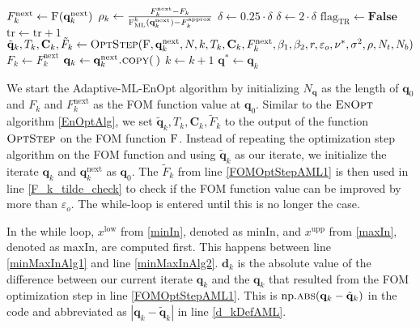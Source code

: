 \begin{algorithm}[H]
\begin{algorithmic}[1]
\State $F^\mathrm{next}_k\gets \Call{F}{\mathbf{q}^\mathrm{next}_k}$
\State\label{rhoKDef} $\rho_k\gets \frac{F^\mathrm{next}_k-F_k}{\Call{F$_\mathrm{ML}^k$}{\mathbf{q}^\mathrm{next}_k}-F^\mathrm{approx}_k}$
\State $\delta\gets0.25\cdot\delta$
\Else
{}
\State $\delta\gets2\cdot\delta$
\EndIf
\EndIf
{}
\State $\mathrm{flag}_\mathrm{TR}\gets\mathbf{False}$
\EndIf
\EndWhile
\State $\mathrm{tr}\gets\mathrm{tr}+1$
\EndWhile
\State\label{FOMOptStepAML2} $\tilde{\mathbf{q}}_k,T_k,\mathbf{C}_k,\tilde{F}_k\gets\Call{OptStep}{\textproc{F},\mathbf{q}^\mathrm{next}_k,N,k,T_k,\mathbf{C}_k, F^\mathrm{next}_k, \beta_1, \beta_2, r, \varepsilon_o ,\nu^*, \sigma^2, \rho, N_t, N_b}$
\State $F_k \gets F^\mathrm{next}_k$
\State\label{AMLSetqk} $\mathbf{q}_k \gets \mathbf{q}^\mathrm{next}_k\Call{.copy}{\:}$
\State $k\gets k+1$
\EndWhile
\State \Return $\mathbf{q}^*\gets\mathbf{q}_k$
\EndFunction
\end{algorithmic}
\end{algorithm}

We start the Adaptive-ML-EnOpt algorithm by initializing $N_\mathbf{q}$ as the length of ${\mathbf{q}_0}$ and $F_k$ and $F^\mathrm{next}_k$ as the FOM function value at $\mathbf{q}_0$. Similar to the $\textproc{EnOpt}$ algorithm \ref{EnOptAlg}, we set $\tilde{\mathbf{q}}_k,T_k,\mathbf{C}_k,\tilde{F}_k$ to the output of the function $\textproc{OptStep}$ on the FOM function $\textproc{F}$. Instead of repeating the optimization step algorithm on the FOM function and using $\tilde{\mathbf{q}}_k$ as our iterate, we initialize the iterate $\mathbf{q}_k$ and $\mathbf{q}^\mathrm{next}_k$ as $\mathbf{q}_0$. The $\tilde{F}_k$ from line \ref{FOMOptStepAML1} is then used in line \ref{F_k_tilde_check} to check if the FOM function value can be improved by more than $\varepsilon_o$. The while-loop is entered until this is no longer the case.

In the while loop, $x^\mathrm{low}$ from \eqref{minIn}, denoted as $\mathrm{minIn}$, and $x^\mathrm{upp}$ from \eqref{maxIn}, denoted as $\mathrm{maxIn}$, are computed first. This happens between line \ref{minMaxInAlg1} and line \ref{minMaxInAlg2}. $\mathbf{d}_k$ is the absolute value of the difference between our current iterate $\mathbf{q}_k$ and the $\mathbf{q}_k$ that resulted from the FOM optimization step in line \ref{FOMOptStepAML1}. This is $\mathrm{np.}\Call{abs}{\mathbf{q}_k-\tilde{\mathbf{q}}_k}$ in the code and abbreviated as $|\mathbf{q}_k-\tilde{\mathbf{q}}_k|$ in line \ref{d_kDefAML}.

